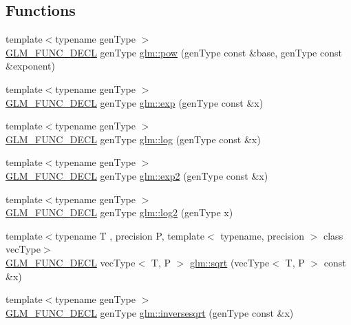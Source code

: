 \subsection*{Functions}
\begin{DoxyCompactItemize}
\item 
{\footnotesize template$<$typename gen\+Type $>$ }\\\hyperlink{setup_8hpp_ab2d052de21a70539923e9bcbf6e83a51}{G\+L\+M\+\_\+\+F\+U\+N\+C\+\_\+\+D\+E\+CL} gen\+Type \hyperlink{group__core__func__exponential_ga1ce4b2fddd26d0d3a35a8d98f37f3ac0}{glm\+::pow} (gen\+Type const \&base, gen\+Type const \&exponent)
\item 
{\footnotesize template$<$typename gen\+Type $>$ }\\\hyperlink{setup_8hpp_ab2d052de21a70539923e9bcbf6e83a51}{G\+L\+M\+\_\+\+F\+U\+N\+C\+\_\+\+D\+E\+CL} gen\+Type \hyperlink{group__core__func__exponential_gae154699ba6bda068d4b87cf9b987381f}{glm\+::exp} (gen\+Type const \&x)
\item 
{\footnotesize template$<$typename gen\+Type $>$ }\\\hyperlink{setup_8hpp_ab2d052de21a70539923e9bcbf6e83a51}{G\+L\+M\+\_\+\+F\+U\+N\+C\+\_\+\+D\+E\+CL} gen\+Type \hyperlink{group__core__func__exponential_ga0c8da2d2921da250e8700ac4476916a1}{glm\+::log} (gen\+Type const \&x)
\item 
{\footnotesize template$<$typename gen\+Type $>$ }\\\hyperlink{setup_8hpp_ab2d052de21a70539923e9bcbf6e83a51}{G\+L\+M\+\_\+\+F\+U\+N\+C\+\_\+\+D\+E\+CL} gen\+Type \hyperlink{group__core__func__exponential_gac45997fb3ac907cad408d6da0a0f5f54}{glm\+::exp2} (gen\+Type const \&x)
\item 
{\footnotesize template$<$typename gen\+Type $>$ }\\\hyperlink{setup_8hpp_ab2d052de21a70539923e9bcbf6e83a51}{G\+L\+M\+\_\+\+F\+U\+N\+C\+\_\+\+D\+E\+CL} gen\+Type \hyperlink{group__core__func__exponential_gad41e336e9bc8190fe99d2cfd9261c19b}{glm\+::log2} (gen\+Type x)
\item 
{\footnotesize template$<$typename T , precision P, template$<$ typename, precision $>$ class vec\+Type$>$ }\\\hyperlink{setup_8hpp_ab2d052de21a70539923e9bcbf6e83a51}{G\+L\+M\+\_\+\+F\+U\+N\+C\+\_\+\+D\+E\+CL} vec\+Type$<$ T, P $>$ \hyperlink{group__core__func__exponential_ga2ea6c6738ad6e09ec3405a628047801b}{glm\+::sqrt} (vec\+Type$<$ T, P $>$ const \&x)
\item 
{\footnotesize template$<$typename gen\+Type $>$ }\\\hyperlink{setup_8hpp_ab2d052de21a70539923e9bcbf6e83a51}{G\+L\+M\+\_\+\+F\+U\+N\+C\+\_\+\+D\+E\+CL} gen\+Type \hyperlink{group__core__func__exponential_ga5ac08ead2e50ad0295b9ad85a3e449e9}{glm\+::inversesqrt} (gen\+Type const \&x)
\end{DoxyCompactItemize}


